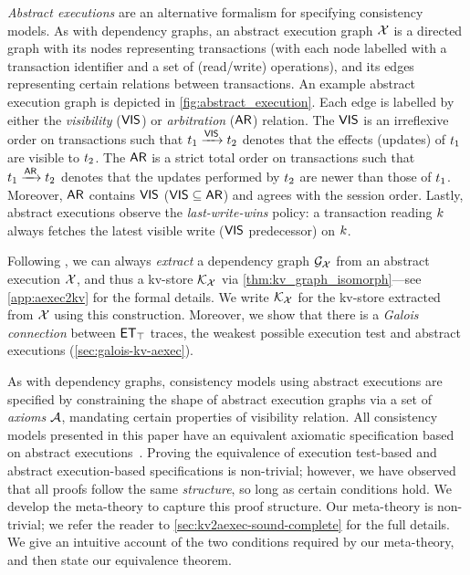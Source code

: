 \begin{theorem}[Compositionality]
\emph{Abstract executions} \cite{ev_transactions,framework-concur} are an alternative formalism for specifying consistency models. 
As with dependency graphs, an abstract execution graph $\mathcal{X}$
is a directed graph with its nodes representing transactions (with each node labelled with a transaction identifier and a set of (read/write) operations), 
and its edges representing certain relations between transactions. 
An example abstract execution graph is depicted in \cref{fig:abstract_execution}. 
Each edge is labelled by either the \emph{visibility} ($\mathsf{VIS}$) or \emph{arbitration} ($\mathsf{AR}$) relation. 
The $\mathsf{VIS}$ is an irreflexive order on transactions such that $t_1 \xrightarrow{\mathsf{VIS}} t_2$ denotes that the effects (updates) of $t_1$ are visible to $t_2$. 
The $\mathsf{AR}$ is a strict total order on transactions such that $t_1 \xrightarrow{\mathsf{AR}} t_2$ denotes that the updates performed by $t_2$ are newer than those of $t_1$. 
Moreover, $\mathsf{AR}$ contains $\mathsf{VIS}$ ($\mathsf{VIS} \subseteq \mathsf{AR}$) and agrees with the session order.
Lastly, abstract executions observe the \emph{last-write-wins} policy: 
a transaction reading $k$ always fetches the latest visible write ($\mathsf{VIS}$ predecessor) on $k$.

Following \cite{laws}, we can always \emph{extract} a dependency graph $\mathcal{G}_{\mathcal{X}}$ from an abstract execution $\mathcal{X}$, and thus a kv-store $\mathcal{K}_{\mathcal{X}}$ via \cref{thm:kv_graph_isomorph}---see \cref{app:aexec2kv} for the formal details.
We write  $\mathcal{K}_{\mathcal{X}}$ for the kv-store extracted from $\mathcal{X}$ using this construction.  
Moreover, we show that there is a \emph{Galois connection}
between $\mathsf{ET}_{\top}$ traces, the weakest possible execution test and abstract executions (\cref{sec:galois-kv-aexec}).

As with dependency graphs, consistency models using abstract executions are specified by constraining the shape of abstract execution graphs via a set of \emph{axioms} $\mathcal{A}$, \eg mandating certain properties of visibility relation. %
All consistency models presented in this paper have an equivalent axiomatic specification based on abstract executions~\cite{framework-concur,laws}. 
Proving the equivalence of execution test-based and abstract execution-based specifications is non-trivial; 
however, we have observed that all proofs follow the same \emph{structure}, so long as certain conditions hold. 
We develop the meta-theory to capture this proof structure.
Our meta-theory is non-trivial; we refer the reader to \cref{sec:kv2aexec-sound-complete} for the full details. 
We give an intuitive account of the two conditions required by our meta-theory, and then state our equivalence theorem. 


\end{theorem}
